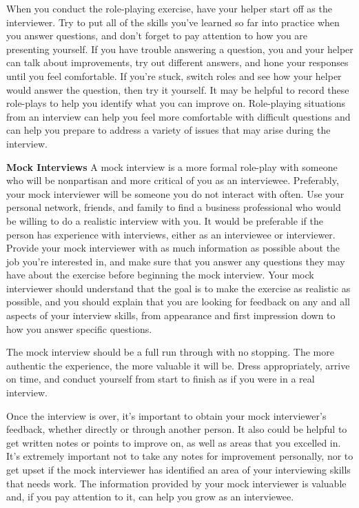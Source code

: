 When you conduct the role-playing exercise, have your helper start off as the interviewer. Try to put all of the skills you've learned so far into practice when you answer questions, and don't forget to pay attention to how you are presenting yourself. If you have trouble answering a question, you and your helper can talk about improvements, try out different answers, and hone your responses until you feel comfortable. If you're stuck, switch roles and see how your helper would answer the question, then try it yourself. It may be helpful to record these role-plays to help you identify what you can improve on. Role-playing situations from an interview can help you feel more comfortable with difficult questions and can help you prepare to address a variety of issues that may arise during the interview.

\textbf{Mock Interviews}
\break A mock interview is a more formal role-play with someone who will be nonpartisan and more critical of you as an interviewee. Preferably, your mock interviewer will be someone you do not interact with often. Use your personal network, friends, and family to find a business professional who would be willing to do a realistic interview with you. It would be preferable if the person has experience with interviews, either as an interviewee or interviewer. Provide your mock interviewer with as much information as possible about the job you're interested in, and make sure that you answer any questions they may have about the exercise before beginning the mock interview. Your mock interviewer should understand that the goal is to make the exercise as realistic as possible, and you should explain that you are looking for feedback on any and all aspects of your interview skills, from appearance and first impression down to how you answer specific questions.

The mock interview should be a full run through with no stopping. The more authentic the experience, the more valuable it will be. Dress appropriately, arrive on time, and conduct yourself from start to finish as if you were in a real interview.

Once the interview is over, it's important to obtain your mock interviewer's feedback, whether directly or through another person. It also could be helpful to get written notes or points to improve on, as well as areas that you excelled in. It's extremely important not to take any notes for improvement personally, nor to get upset if the mock interviewer has identified an area of your interviewing skills that needs work. The information provided by your mock interviewer is valuable and, if you pay attention to it, can help you grow as an interviewee.

